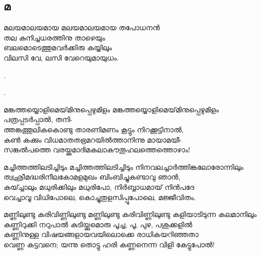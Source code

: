 \subsection{മ}
\begin{enumerate}


\begin{slokam}{\VDv}{\Ull}{മലയമാലയമായ}
മലയമാലയമായ തപോധനന്‍\\
തല കുനിച്ചധരത്തിനു താഴെയും\\
ബലമൊടെത്തുമവര്‍ക്കിരു കയ്യിലും\\
വിലസി വേ, ലസി വേറെയുമായുധം.
\end{slokam}


.

. 


\begin{slokam}{\VSv}{\NNM}{മങ്കത്തയ്യൊളിമെയ്‌മിനുപ്പെഴുമിളം}
മങ്കത്തയ്യൊളിമെയ്‌മിനുപ്പെഴുമിളം പത്രപ്പടർപ്പാൽ, തനി-\\
ത്തങ്കത്തൂലികകൊണ്ടു താരണിമണം കൂട്ടും നിറക്കൂട്ടിനാൽ,\\
കൺ കക്കും വിധമാതതഭ്രമറയിൽത്താനിന്നു മായാമയീ-\\
സങ്കൽപത്തെ വരയ്ക്കുമാദിമകലാകൗതൂഹലത്തെത്തൊഴാം!
\end{slokam}


\begin{slokam}{\VSv}{\VKG}{മച്ചിത്തത്തിലടിച്ചിടും}
 മച്ചിത്തത്തിലടിച്ചിടും നിനവലച്ചാർത്തിങ്കലോരോന്നിലും\\
ത്വഛ്രീമദ്ധരിനീലകോമളമുഖം ബിംബിച്ചുകണ്ടാവു ഞാൻ,\\
കയ്ച്ചാലും മധുരിക്കിലും മധുരിപോ, നിർബ്ബാധമായ്‌ നിൻപദേ\\
വെച്ചാവൂ വിധിപോലെ, കൊച്ചുതുളസിപ്പൂപോലെ, മജ്ജീവിതം.
\end{slokam}



\begin{slokam}{\VKm}{\PCM}{മണ്ണിലുണ്ടു കരിവിണ്ണിലുണ്ടു}
 മണ്ണിലുണ്ടു കരിവിണ്ണിലുണ്ടു കളിയാടിടുന്ന കലമാനിലും\\
കണ്ണിറുക്കി നറുപാൽ കുടിയ്ക്കുമൊരു പൂച്ച, പൂ, പുഴ, പശുക്കളിൽ\\
കണ്ണിനുള്ള വിഷയങ്ങളായവയിലൊക്കെ രാധികയറിഞ്ഞതാ\\
വെണ്ണ കട്ടവനെ; യന്നു തൊട്ടു ഹരി കണ്ണനെന്ന വിളി കേട്ടുപോൽ!
\end{slokam}



\end{enumerate}
